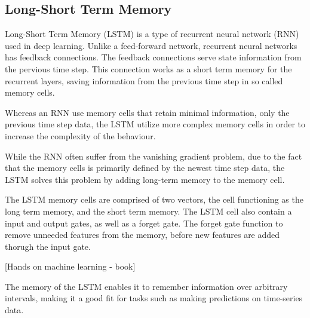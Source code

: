 \cite[p.~492-493]{Geron2017}





\iffalse
\subsection{Long-Short Term Memory}

Long-Short Term Memory (LSTM) is a type of recurrent neural network (RNN) used in deep learning.
Unlike a feed-forward network, recurrent neural networks has feedback connections.
The feedback connections serve state information from the pervious time step.
This connection works as a short term memory for the recurrent layers, saving information from the previous time step in so called memory cells.

Whereas an RNN use memory cells that retain minimal information, only the previous time step data, the LSTM utilize more complex memory cells in order to increase the complexity of the behaviour.

While the RNN often suffer from the vanishing gradient problem, due to the fact that the memory cells is primarily defined by the newest time step data, the LSTM solves this problem by adding long-term memory to the memory cell.

The LSTM memory cells are comprised of two vectors, the cell functioning as the long term memory, and the short term memory.
The LSTM cell also contain a input and output gates, as well as a forget gate.
The forget gate function to remove unneeded features from the memory, before new features are added thorugh the input gate.

[Hands on machine learning - book]

The memory of the LSTM enables it to remember information over arbitrary intervals, making it a good fit for tasks such as making predictions on time-series data.

